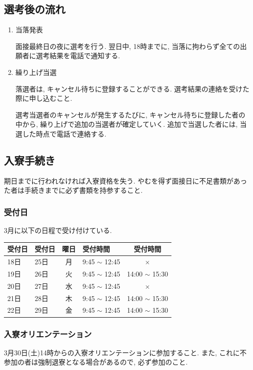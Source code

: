 \documentclass[10pt,b5jsbook,dvips,dvipdfmx,openany]{jsbook}
\theoremstyle{definition}
\begin{document}
		\subsection{選考後の流れ}
		\begin{enumerate}
		\item 当落発表

		面接最終日の夜に選考を行う. 翌日中, 18時までに, 当落に拘わらず全ての出願者に選考結果を電話で通知する.
		\item 繰り上げ当選

 		落選者は, キャンセル待ちに登録することができる. 選考結果の連絡を受けた際に申し込むこと.

 		選考当選者のキャンセルが発生するたびに, キャンセル待ちに登録した者の中から, 繰り上げで追加の当選者が確定していく. 追加で当選した者には, 当選した時点で電話で連絡する.
		\end{enumerate}

		\subsection{入寮手続き}
		期日までに行われなければ入寮資格を失う. やむを得ず面接日に不足書類があった者は手続きまでに必ず書類を持参すること.
			\subsubsection{受付日}  3月に以下の日程で受け付けている. %
			\begin{table}[h]
\begin{tabular}{|l|l|c|l|c|}
\hline
受付日        &      受付日 & 曜日 & 受付時間 & 受付時間                 \\ \hline \hline
18日         & 25日        & 月 & 9:45 $ \sim $ 12:45 & $ \times $           \\ \hline
19日         & 26日        & 火 & 9:45 $ \sim $ 12:45 & 14:00 $ \sim $ 15:30 \\ \hline
20日         & 27日        & 水 & 9:45 $ \sim $ 12:45 & $ \times $           \\ \hline
21日         & 28日        & 木 & 9:45 $ \sim $ 12:45 & 14:00 $ \sim $ 15:30 \\ \hline
22日         & 29日        & 金 & 9:45 $ \sim $ 12:45 & 14:00 $ \sim $ 15:30 \\ \hline
\end{tabular}
\end{table}
\subsubsection{入寮オリエンテーション}
			3月30日(土)14時からの入寮オリエンテーションに参加すること. また, これに不参加の者は強制退寮となる場合があるので, 必ず参加のこと.
\end{document}
